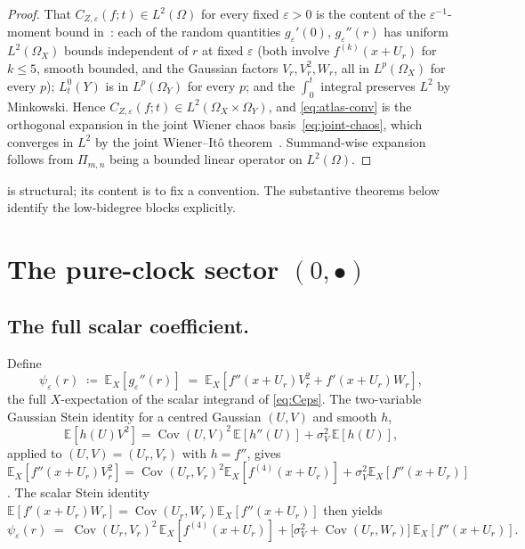 \documentclass[11pt,reqno]{amsart}
\theoremstyle{plain}
\theoremstyle{definition}
\theoremstyle{remark}
\newcommand{\E}{\mathbb{E}}
\newcommand{\IBM}{Z}
\newcommand{\Pir}{\Pi}
\DeclareMathOperator{\Cov}{Cov}
\begin{document}
\begin{proof}
That $C_{\IBM,\varepsilon}(f;t)\in L^{2}(\Omega)$ for every fixed
$\varepsilon>0$ is the content of the $\varepsilon^{-1}$-moment
bound in~\cite[Sec.\ 8]{Fontes-EnergyFirst}: each of the random
quantities $g_\varepsilon'(0)$, $g_\varepsilon''(r)$ has uniform
$L^{2}(\Omega_X)$ bounds independent of $r$ at fixed $\varepsilon$
(both involve $f^{(k)}(x+U_r)$ for $k\le 5$, smooth bounded, and the
Gaussian factors $V_r,V_r^2,W_r$, all in $L^{p}(\Omega_X)$ for every
$p$); $L_t^0(Y)$ is in $L^{p}(\Omega_Y)$ for every $p$; and the
$\int_0^t$ integral preserves $L^{2}$ by Minkowski. Hence
$C_{\IBM,\varepsilon}(f;t)\in L^{2}(\Omega_X\times\Omega_Y)$, and
\eqref{eq:atlas-conv} is the orthogonal expansion in the joint
Wiener chaos basis~\eqref{eq:joint-chaos}, which converges in
$L^{2}$ by the joint Wiener--It\^o theorem~\cite{Nualart,Janson}.
Summand-wise expansion follows from $\Pir_{m,n}$ being a bounded
linear operator on $L^{2}(\Omega)$.
\end{proof}

 is structural; its content is to fix a convention.
The substantive theorems below identify the low-bidegree blocks
explicitly.

\section{The pure-clock sector \texorpdfstring{$(0,\bullet)$}{(0,*)}}\label{sec:pure-clock}

\subsection*{The full scalar coefficient.}
Define
\begin{equation}\label{eq:psi-def}
 \psi_\varepsilon(r)\;\coloneqq\;\E_X[g_\varepsilon''(r)]
 \;=\;\E_X[f''(x+U_r)V_r^2+f'(x+U_r)W_r],
\end{equation}
the full $X$-expectation of the scalar integrand of \eqref{eq:Ceps}.
The two-variable Gaussian Stein identity for a centred Gaussian
$(U,V)$ and smooth $h$,
\begin{equation}\label{eq:Stein-sq}
 \E[h(U)V^2]=\Cov(U,V)^2\,\E[h''(U)]+\sigma_V^2\,\E[h(U)],
\end{equation}
applied to $(U,V)=(U_r,V_r)$ with $h=f''$, gives
$\E_X[f''(x+U_r)V_r^2]=\Cov(U_r,V_r)^2\E_X[f^{(4)}(x+U_r)]+\sigma_V^2\E_X[f''(x+U_r)]$.
The scalar Stein identity
$\E[f'(x+U_r)W_r]=\Cov(U_r,W_r)\E_X[f''(x+U_r)]$ then yields
\begin{equation}\label{eq:psi-decomp}
 \psi_\varepsilon(r)
 \;=\;\Cov(U_r,V_r)^2\,\E_X[f^{(4)}(x+U_r)]
   +\bigl[\sigma_V^2+\Cov(U_r,W_r)\bigr]\,\E_X[f''(x+U_r)].
\end{equation}
\end{document}
